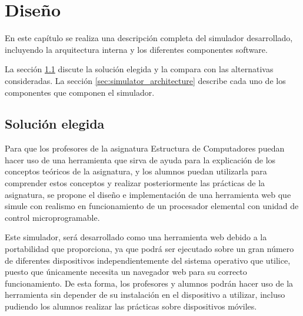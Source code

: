 \chead[]{}
\renewcommand{\headrulewidth}{0.5pt}

\lfoot[]{}
\cfoot[]{}
\rfoot[]{}
\renewcommand{\footrulewidth}{0pt}

\chapter{Diseño}
\label{ch:design}

En este capítulo se realiza una descripción completa del simulador desarrollado, incluyendo la arquitectura interna y los diferentes componentes software.

La sección \ref{sec:solution_selection} discute la solución elegida y la compara con las alternativas consideradas. La sección \ref{sec:simulator_architecture} describe cada uno de los componentes que componen el simulador.

\section{Solución elegida}
\label{sec:solution_selection}

Para que los profesores de la asignatura Estructura de Computadores puedan hacer uso de una herramienta que sirva de ayuda para la explicación de los conceptos teóricos de la asignatura, y los alumnos puedan utilizarla para comprender estos conceptos y realizar posteriormente las prácticas de la asignatura, se propone el diseño e implementación de una herramienta web que simule con realismo en funcionamiento de un procesador elemental con unidad de control microprogramable.

Este simulador, será desarrollado como una herramienta web debido a la portabilidad que proporciona, ya que podrá ser ejecutado sobre un gran número de diferentes dispositivos independientemente del sistema operativo que utilice, puesto que únicamente necesita un navegador web para su correcto funcionamiento. De esta forma, los profesores y alumnos podrán hacer uso de la herramienta sin depender de su instalación en el dispositivo a utilizar, incluso pudiendo los alumnos realizar las prácticas sobre dispositivos móviles.

